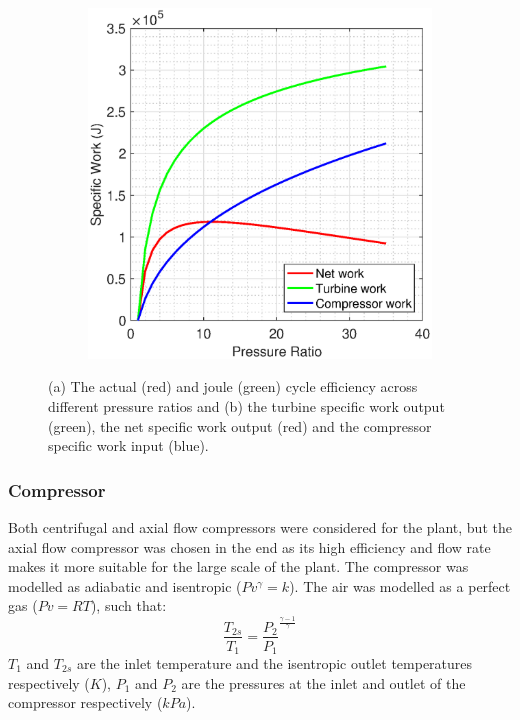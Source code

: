 \documentclass[11pt, oneside]{article}
\begin{document}
\begin{figure} [h]
\begin{subfigure}{.7\textwidth}
 \includegraphics[width=0.9\linewidth]{./pictures/network.eps}
 \label{fig:sub2}
\end{subfigure}
\caption{(a) The actual (red) and joule (green) cycle efficiency across different pressure ratios and (b) the turbine specific work output (green), the net specific work output (red) and the compressor specific work input (blue).}
\label{fig:efficiencysimple}
\end{figure} 

\subsubsection{Compressor} \label{ssec:compressor}
Both centrifugal and axial flow compressors were considered for the plant, but the axial flow compressor was chosen in the end as its high efficiency and flow rate makes it more suitable for the large scale of the plant. The compressor was modelled as adiabatic and isentropic ($Pv^{\gamma} = k$). The air was modelled as a perfect gas ($Pv = RT$), such that:
\begin{equation}
\frac{T_{2s}}{T_1} = \frac{P_2}{P_1}^{\frac{\gamma-1}{\gamma}}
\end{equation}
$T_{1}$ and $T_{2s}$ are the inlet temperature and the isentropic outlet temperatures respectively ($K$), $P_1$ and $P_2$ are the pressures at the inlet and outlet of the compressor respectively ($kPa$).
\end{document}
